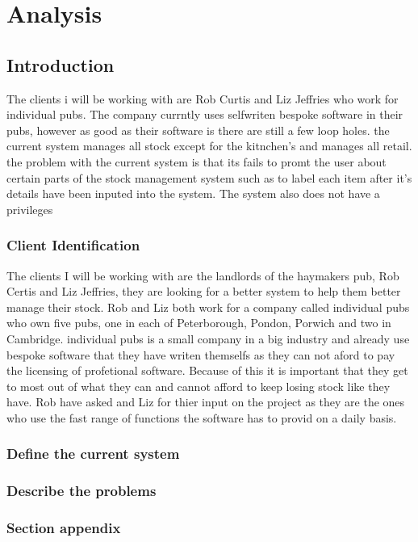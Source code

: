 \chapter{Analysis}

\section{Introduction}
The clients i will be working with are Rob Curtis and Liz Jeffries who work for individual pubs. The company currntly uses selfwriten bespoke software in their pubs, however as good as their software is there are still a few loop holes. the current system manages all stock except for the kitnchen's and manages all retail. the problem with the current system is that its fails to promt the user about certain parts of the stock management system such as to label each item after it's details have been inputed into the system. The system also does not have a privileges 
\subsection{Client Identification}
The clients I will be working with are the landlords of the haymakers pub, Rob Certis and Liz Jeffries, they are looking for a better system to help them better manage their stock. Rob and Liz both work for a company called individual pubs who own five pubs, one in each of Peterborough, Pondon, Porwich and two in Cambridge. individual pubs is a small company in a big industry and already use bespoke software that they have writen themselfs as they can not aford to pay the licensing of profetional software. Because of this it is important that they get to most out of what they can and cannot afford to keep losing stock like they have. Rob have asked and Liz for thier input on the project as they are the ones who use the fast range of functions the software has to provid on a daily basis.
\subsection{Define the current system}

\subsection{Describe the problems}

\subsection{Section appendix}

